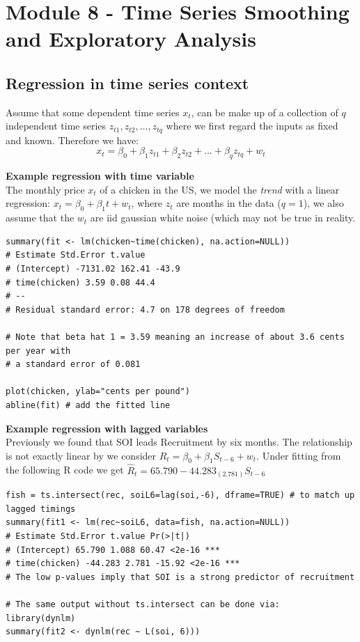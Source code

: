 \documentclass[11pt]{article}
\newcommand{\noi}{\noindent}
\begin{document}
\section{Module 8 - Time Series Smoothing and Exploratory Analysis}

\subsection{Regression in time series context}
\noi Assume that some dependent time series $x_t$, can be make up of a collection of $q$ independent time series $z_{t1},z_{t2},...,z_{tq}$ where we first regard the inputs as fixed and known. Therefore we have:
$$x_t = \beta_0 + \beta_1z_{t1} + \beta_2z_{t2} + ... + \beta_qz_{tq} + w_t$$

\noi \textbf{Example regression with time variable} \\
\noi The monthly price $x_t$ of a chicken in the US, we model the \textit{trend} with a linear regression: $x_t = \beta_0 + \beta_1 t + w_t$, where $z_t$ are months in the data ($q=1$), we also assume that the $w_t$ are iid gaussian white noise (which may not be true in reality.
\begin{lstlisting}
summary(fit <- lm(chicken~time(chicken), na.action=NULL))
# Estimate Std.Error t.value
# (Intercept) -7131.02 162.41 -43.9
# time(chicken) 3.59 0.08 44.4
# --
# Residual standard error: 4.7 on 178 degrees of freedom

# Note that beta hat 1 = 3.59 meaning an increase of about 3.6 cents per year with
# a standard error of 0.081

plot(chicken, ylab="cents per pound")
abline(fit) # add the fitted line
\end{lstlisting}

\noi \textbf{Example regression with lagged variables} \\
\noi Previously we found that SOI leads Recruitment by six months. The relationship is not exactly linear by we consider $R_t = \beta_0 + \beta_1 S_{t-6} + w_t$. Under fitting from the following R code we get $\hat R_t = 65.790 - 44.283_{(2.781)}S_{t-6}$
\begin{lstlisting}
fish = ts.intersect(rec, soiL6=lag(soi,-6), dframe=TRUE) # to match up lagged timings
summary(fit1 <- lm(rec~soiL6, data=fish, na.action=NULL))
# Estimate Std.Error t.value Pr(>|t|)
# (Intercept) 65.790 1.088 60.47 <2e-16 ***
# time(chicken) -44.283 2.781 -15.92 <2e-16 ***
# The low p-values imply that SOI is a strong predictor of recruitment

# The same output without ts.intersect can be done via:
library(dynlm)
summary(fit2 <- dynlm(rec ~ L(soi, 6)))
\end{lstlisting}
\end{document}
